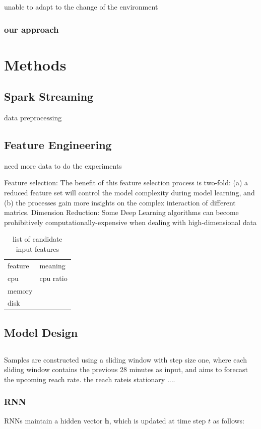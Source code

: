 \documentclass[review]{elsarticle}
\newcommand{\dabiaolv}{reach rate}
\begin{document}
unable to adapt to the change of the environment
\subsubsection{our approach}


\section{Methods}
\subsection{Spark Streaming}
data preprocessing
\subsection{Feature Engineering}
need more data to do the experiments

Feature selection:  The benefit of this feature selection process is two-fold: (a) a reduced feature set will control the model complexity during model learning, and (b) the processes gain more insights on the complex interaction of different matrics. \cite{Yeom2016Data-DrivenMatrices}
Dimension Reduction:
Some Deep Learning algorithms can become prohibitively computationally-expensive when dealing with high-dimensional data


\begin{table}[]
\centering
\begin{tabular}{ll}
feature & meaning \\
  cpu     &    cpu ratio     \\
  memory  &         \\
   disk   &        
\end{tabular}
\caption{list of candidate input features}
\label{my-label}
\end{table}



\subsection{Model Design}
\subsection{}
Samples  are  constructed  using  a  sliding  window  with step size one, where each sliding window contains the previous 28 minutes as input, and aims to forecast the upcoming \dabiaolv. the \dabiaolv is stationary ....
\subsubsection{RNN}
RNNs maintain a hidden vector $\mathbf h$, which is updated at time step $t$ as follows:
 
\end{document}
